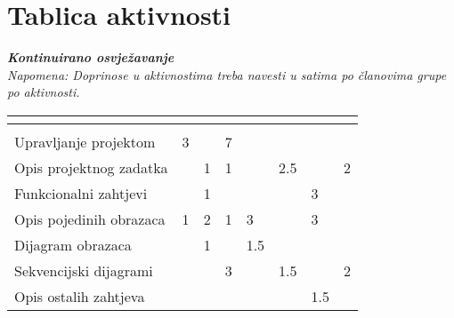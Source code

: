 \begin{packed_enum}
			
		\end{packed_enum}
		
		\eject
		\section*{Tablica aktivnosti}
		
			\textbf{\textit{Kontinuirano osvježavanje}}\\
			
			 \textit{Napomena: Doprinose u aktivnostima treba navesti u satima po članovima grupe po aktivnosti.}
					
						
			
			\begin{longtabu} to \textwidth {|X[7, l]|X[1, c]|X[1, c]|X[1, c]|X[1, c]|X[1, c]|X[1, c]|X[1, c]|}
								
				  &      &  &	 &	 &
				 &
				 &	 \\ \hline 
				\endfirsthead
				
			
				  &      &  &	 &
				 &	 &
				 &	 \\ \hline 
				\endhead
				
				
				\endfoot
							
				 
				\endlastfoot
				
				Upravljanje projektom 		& 3 &  & 7 &  &  &  & \\ \hline
				Opis projektnog zadatka 	&  & 1 & 1 &  & 2.5  &  & 2\\ \hline
				
				Funkcionalni zahtjevi       &  & 1 &  &  &  & 3 &  \\ \hline
				Opis pojedinih obrazaca 	& 1 & 2 & 1 & 3 &  & 3 & \\ \hline
				Dijagram obrazaca 			&  & 1 &  & 1.5 &  &  & \\ \hline
				Sekvencijski dijagrami 		&  &  & 3 &  & 1.5 &  & 2\\ \hline
				Opis ostalih zahtjeva 		&  &  &  &  &  & 1.5 &  \\ \hline


\end{longtabu}
